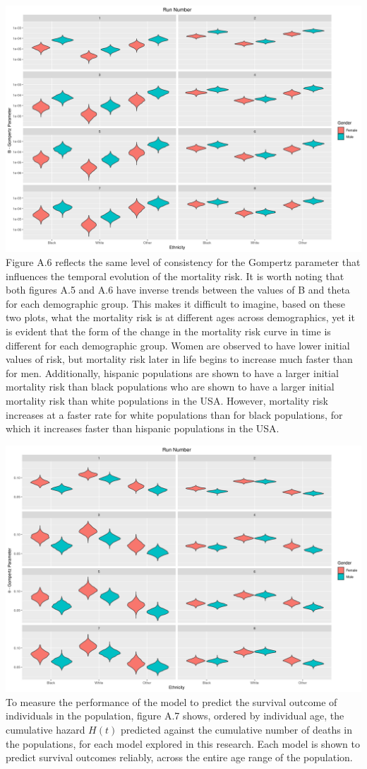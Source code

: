 \documentclass[
]{article}
\begin{document}
\includegraphics{../Plots/gompertz/B_parameter.png} Figure A.6 reflects
the same level of consistency for the Gompertz parameter that influences
the temporal evolution of the mortality risk. It is worth noting that
both figures A.5 and A.6 have inverse trends between the values of B and
theta for each demographic group. This makes it difficult to imagine,
based on these two plots, what the mortality risk is at different ages
across demographics, yet it is evident that the form of the change in
the mortality risk curve in time is different for each demographic
group. Women are observed to have lower initial values of risk, but
mortality risk later in life begins to increase much faster than for
men. Additionally, hispanic populations are shown to have a larger
initial mortality risk than black populations who are shown to have a
larger initial mortality risk than white populations in the USA.
However, mortality risk increases at a faster rate for white populations
than for black populations, for which it increases faster than hispanic
populations in the USA.

\includegraphics{../Plots/gompertz/theta_parameter.png} To measure the
performance of the model to predict the survival outcome of individuals
in the population, figure A.7 shows, ordered by individual age, the
cumulative hazard \(H(t)\) predicted against the cumulative number of
deaths in the populations, for each model explored in this research.
Each model is shown to predict survival outcomes reliably, across the
entire age range of the population.
\end{document}
